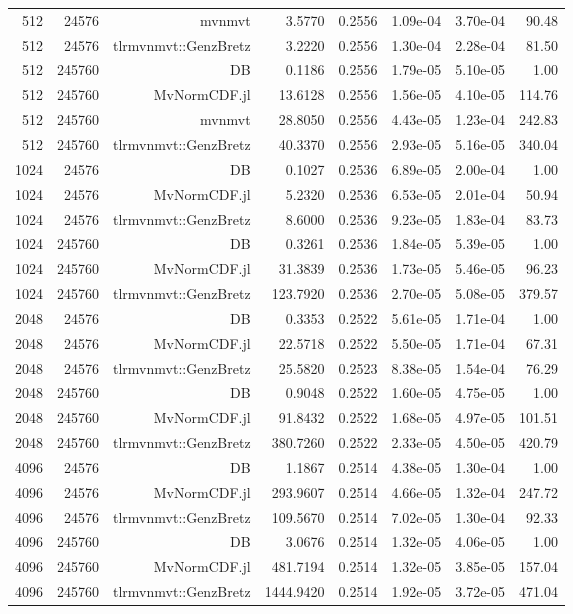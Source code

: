 \begin{tabular}{|r|r|r|r|r|r|r|r|}
  512 & 24576 & mvnmvt & 3.5770 & 0.2556 & 1.09e-04 & 3.70e-04 & 90.48 \\
  512 & 24576 & tlrmvnmvt::GenzBretz & 3.2220 & 0.2556 & 1.30e-04 & 2.28e-04 & 81.50 \\
  512 & 245760 & DB & 0.1186 & 0.2556 & 1.79e-05 & 5.10e-05 & 1.00 \\
  512 & 245760 & MvNormCDF.jl & 13.6128 & 0.2556 & 1.56e-05 & 4.10e-05 & 114.76 \\
  512 & 245760 & mvnmvt & 28.8050 & 0.2556 & 4.43e-05 & 1.23e-04 & 242.83 \\
  512 & 245760 & tlrmvnmvt::GenzBretz & 40.3370 & 0.2556 & 2.93e-05 & 5.16e-05 & 340.04 \\
  1024 & 24576 & DB & 0.1027 & 0.2536 & 6.89e-05 & 2.00e-04 & 1.00 \\
  1024 & 24576 & MvNormCDF.jl & 5.2320 & 0.2536 & 6.53e-05 & 2.01e-04 & 50.94 \\
  1024 & 24576 & tlrmvnmvt::GenzBretz & 8.6000 & 0.2536 & 9.23e-05 & 1.83e-04 & 83.73 \\
  1024 & 245760 & DB & 0.3261 & 0.2536 & 1.84e-05 & 5.39e-05 & 1.00 \\
  1024 & 245760 & MvNormCDF.jl & 31.3839 & 0.2536 & 1.73e-05 & 5.46e-05 & 96.23 \\
  1024 & 245760 & tlrmvnmvt::GenzBretz & 123.7920 & 0.2536 & 2.70e-05 & 5.08e-05 & 379.57 \\
  2048 & 24576 & DB & 0.3353 & 0.2522 & 5.61e-05 & 1.71e-04 & 1.00 \\
  2048 & 24576 & MvNormCDF.jl & 22.5718 & 0.2522 & 5.50e-05 & 1.71e-04 & 67.31 \\
  2048 & 24576 & tlrmvnmvt::GenzBretz & 25.5820 & 0.2523 & 8.38e-05 & 1.54e-04 & 76.29 \\
  2048 & 245760 & DB & 0.9048 & 0.2522 & 1.60e-05 & 4.75e-05 & 1.00 \\
  2048 & 245760 & MvNormCDF.jl & 91.8432 & 0.2522 & 1.68e-05 & 4.97e-05 & 101.51 \\
  2048 & 245760 & tlrmvnmvt::GenzBretz & 380.7260 & 0.2522 & 2.33e-05 & 4.50e-05 & 420.79 \\
  4096 & 24576 & DB & 1.1867 & 0.2514 & 4.38e-05 & 1.30e-04 & 1.00 \\
  4096 & 24576 & MvNormCDF.jl & 293.9607 & 0.2514 & 4.66e-05 & 1.32e-04 & 247.72 \\
  4096 & 24576 & tlrmvnmvt::GenzBretz & 109.5670 & 0.2514 & 7.02e-05 & 1.30e-04 & 92.33 \\
  4096 & 245760 & DB & 3.0676 & 0.2514 & 1.32e-05 & 4.06e-05 & 1.00 \\
  4096 & 245760 & MvNormCDF.jl & 481.7194 & 0.2514 & 1.32e-05 & 3.85e-05 & 157.04 \\
  4096 & 245760 & tlrmvnmvt::GenzBretz & 1444.9420 & 0.2514 & 1.92e-05 & 3.72e-05 & 471.04 \\
  \hline
\end{tabular}
